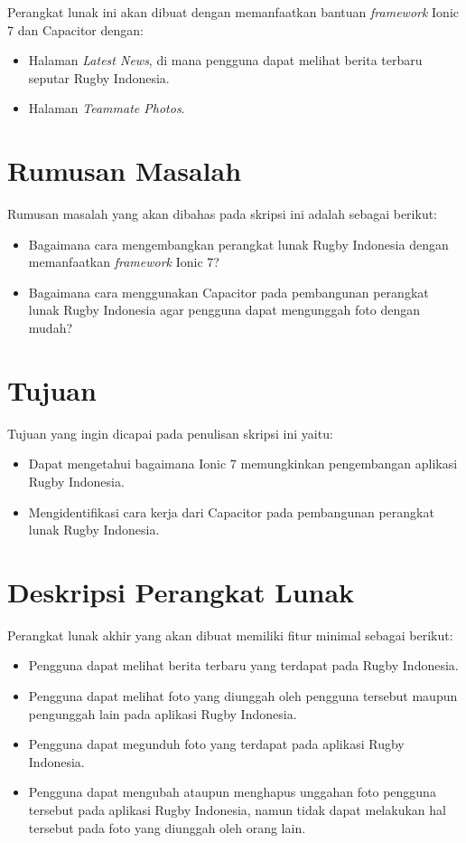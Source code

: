 \documentclass[a4paper,twoside]{article}
\begin{document}
Perangkat lunak ini akan dibuat dengan memanfaatkan bantuan {\it framework} Ionic 7 dan Capacitor dengan:

\begin{itemize}
    \item Halaman \textit{Latest News}, di mana pengguna dapat melihat berita terbaru seputar Rugby Indonesia.
    \item Halaman \textit{Teammate Photos}.
\end{itemize}


\section{Rumusan Masalah}
Rumusan masalah yang akan dibahas pada skripsi ini adalah sebagai berikut:
\begin{itemize}
    \item Bagaimana cara mengembangkan perangkat lunak Rugby Indonesia dengan memanfaatkan \textit{framework} Ionic 7?
    \item Bagaimana cara menggunakan Capacitor pada pembangunan perangkat lunak Rugby Indonesia agar pengguna dapat mengunggah foto dengan mudah?
\end{itemize}

\section{Tujuan}
Tujuan yang ingin dicapai pada penulisan skripsi ini yaitu:
\begin{itemize}
    \item Dapat mengetahui bagaimana Ionic 7 memungkinkan pengembangan aplikasi Rugby Indonesia.
    \item Mengidentifikasi cara kerja dari Capacitor pada pembangunan perangkat lunak Rugby Indonesia.
\end{itemize}

\section{Deskripsi Perangkat Lunak}

Perangkat lunak akhir yang akan dibuat memiliki fitur minimal sebagai berikut:
\begin{itemize}
    \item Pengguna dapat melihat berita terbaru yang terdapat pada Rugby Indonesia.
    \item Pengguna dapat melihat foto yang diunggah oleh pengguna tersebut maupun pengunggah lain pada aplikasi Rugby Indonesia.
    \item Pengguna dapat megunduh foto yang terdapat pada aplikasi Rugby Indonesia.
    \item Pengguna dapat mengubah ataupun menghapus unggahan foto pengguna tersebut pada aplikasi Rugby Indonesia, namun tidak dapat melakukan hal tersebut pada foto yang diunggah oleh orang lain.
\end{itemize}
\end{document}
